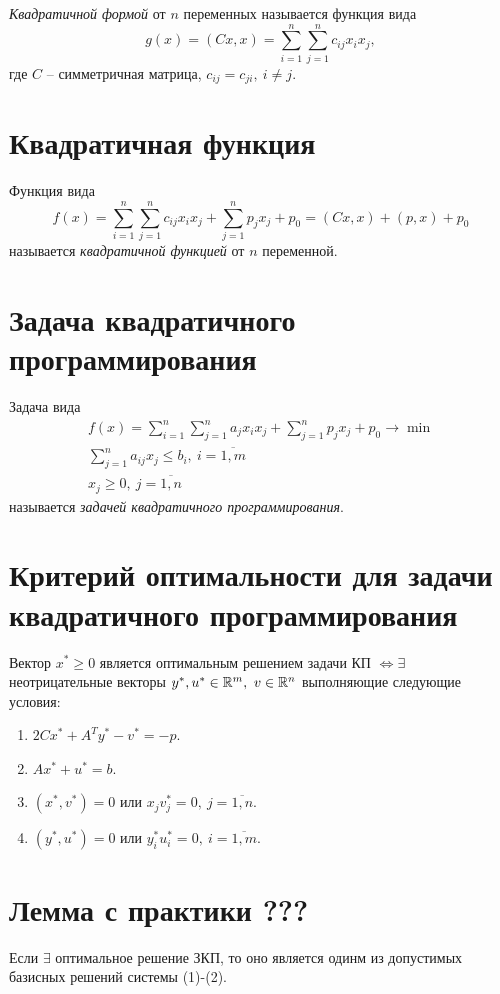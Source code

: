 \begin{definition}
	\emph{Квадратичной формой} от $n$ переменных называется функция вида
	\[
		g(x) = (Cx,x) = \sum_{i=1}^{n}\sum_{j=1}^{n}c_{ij}x_ix_j,
	\]
	где $C$ -- симметричная матрица, $c_{ij} = c_{ji}, \ i \ne j$.
\end{definition}

\section{Квадратичная функция}

\begin{definition}
	Функция вида
	\[
		f(x)=\sum_{i=1}^{n}\sum_{j=1}^{n}c_{ij}x_ix_j + \sum_{j=1}^{n}p_jx_j + p_0 = (Cx,x) + (p,x) + p_0
	\]
	называется \emph{квадратичной функцией} от $n$ переменной.
\end{definition}

\section{Задача квадратичного программирования}

\begin{definition}
	Задача вида
	\[
		\begin{array}{l}
			f(x)=\sum_{i=1}^{n}\sum_{j=1}^{n}a_jx_ix_j + \sum_{j=1}^{n}p_jx_j + p_0 \rightarrow \min \\
			\sum_{j=1}^{n}a_{ij}x_j \leqslant b_i, \ i = \overline{1,m}                              \\
			x_j \geqslant 0, \ j= \overline{1,n}
		\end{array}
	\]
	называется \emph{задачей квадратичного программирования}.
\end{definition}

\newpage

\section{Критерий оптимальности для задачи квадратичного программирования}

\begin{theorem}
	Вектор $x^* \geqslant 0$ является оптимальным решением задачи КП $\iff \exists $ неотрицательные векторы $y^*,u^* \in \mathbb{R}^m, \ v \in \mathbb{R}^n$ выполняющие следующие условия:
	\begin{enumerate}
		\item $2Cx^* + A^Ty^* - v^* = -p$.
		\item $Ax^* + u^* = b$.
		\item $(x^*,v^*) = 0$ или $x_jv_{j}^{*}=0, \ j=\overline{1,n}$.
		\item $(y^*,u^*)=0$ или $y_{i}^{*}u_{i}^{*}=0, \ i = \overline{1,m}$.
	\end{enumerate}
\end{theorem}

\section{Лемма с практики ???}

\begin{remark}
	Если $\exists $ оптимальное решение ЗКП, то оно является одинм из допустимых базисных решений системы (1)-(2).
\end{remark}
